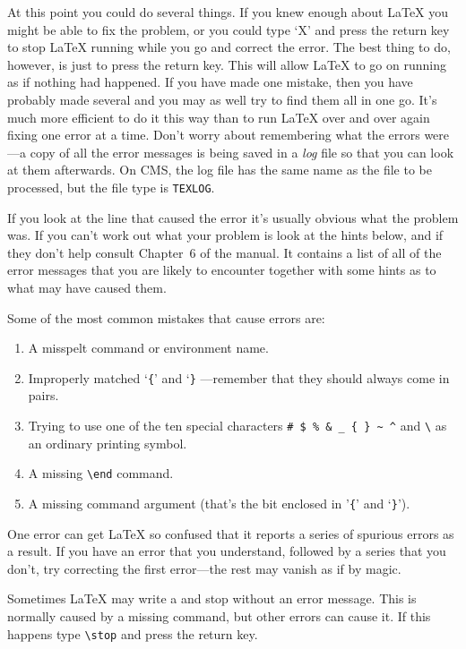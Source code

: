 At this point you could do several things.
If you knew enough about \LaTeX{} you might be able to fix the problem,
or you could type `X' and press the return key to stop \LaTeX{} running
while you go and correct the error.
The best thing to do, however, is just to press the return key.
This will allow \LaTeX{} to go on running as if nothing had happened.
If you have made one mistake, then you have probably made several
and you may as well try to find them all in one go.
It's much more efficient to do it this way than to run
\LaTeX{} over and over again fixing one error at a time.
Don't worry about remembering what the errors were---a copy of all
the error messages is being
saved in a {\em log\/} file so that you can look at them afterwards.
On CMS, the log file has the same name as the file to be processed, but
the file type is {\tt TEXLOG}.
 
If you look at the line that caused the error it's usually obvious
what the problem was.
If you can't work out what your problem is look at the hints
below, and if they don't help consult Chapter~6 of the manual.
It contains a list of all of the error messages that you are likely
to encounter together with some hints as to what may have caused them.
 
Some of the most common mistakes that cause errors are:
\begin{enumerate}
\item A misspelt command or environment name.
\item Improperly matched `\verb+{+' and `\verb+}+ ---remember
that they should always come in pairs.
\item Trying to use one of the ten special
characters \verb|# $ % & _ { } ~ ^| and \verb|\| as an ordinary
printing symbol.
\item A missing \verb|\end| command.
\item A missing command argument (that's the bit enclosed
in '\verb+{+' and `\verb+}+').
\end{enumerate}
 
One error can get \LaTeX{} so confused that it reports a series of
spurious errors as a result.
If you have an error that you understand, followed by a series that you
don't, try correcting the first error---the rest may vanish as if
by magic.
 
Sometimes \LaTeX{} may write a {\tt *} and stop without an error message.
This is normally caused by a missing \verb++ command,
but other errors can cause it.
If this happens type \verb+\stop+ and press the return key.
 
